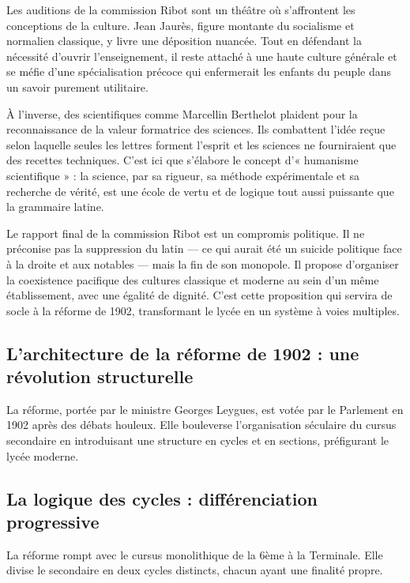 Les auditions de la commission Ribot sont un théâtre où s'affrontent les conceptions de la culture.
Jean Jaurès, figure montante du socialisme et normalien classique, y livre une déposition nuancée.
Tout en défendant la nécessité d'ouvrir l'enseignement, il reste attaché à une haute culture
générale et se méfie d'une spécialisation précoce qui enfermerait les enfants du peuple dans un
savoir purement utilitaire.\cite{I-2-1-ref3}

À l'inverse, des scientifiques comme Marcellin Berthelot plaident pour la reconnaissance de la
valeur formatrice des sciences. Ils combattent l'idée reçue selon laquelle seules les lettres
forment l'esprit et les sciences ne fourniraient que des recettes techniques. C'est ici que
s'élabore le concept d'« humanisme scientifique » : la science, par sa rigueur, sa méthode
expérimentale et sa recherche de vérité, est une école de vertu et de logique tout aussi puissante
que la grammaire latine.\cite{I-2-1-ref4}

Le rapport final de la commission Ribot est un compromis politique. Il ne préconise pas la
suppression du latin — ce qui aurait été un suicide politique face à la droite et aux notables —
mais la fin de son monopole. Il propose d'organiser la coexistence pacifique des cultures classique
et moderne au sein d'un même établissement, avec une égalité de dignité. C'est cette proposition qui
servira de socle à la réforme de 1902, transformant le lycée en un système à voies multiples.



\subsection{L'architecture de la réforme de 1902 : une révolution structurelle}

La réforme, portée par le ministre Georges Leygues, est votée par le Parlement en 1902 après des
débats houleux. Elle bouleverse l'organisation séculaire du cursus secondaire en introduisant une
structure en cycles et en sections, préfigurant le lycée moderne.



\subsection{La logique des cycles : différenciation progressive}

La réforme rompt avec le cursus monolithique de la 6ème à la Terminale. Elle divise le secondaire en
deux cycles distincts, chacun ayant une finalité propre.

